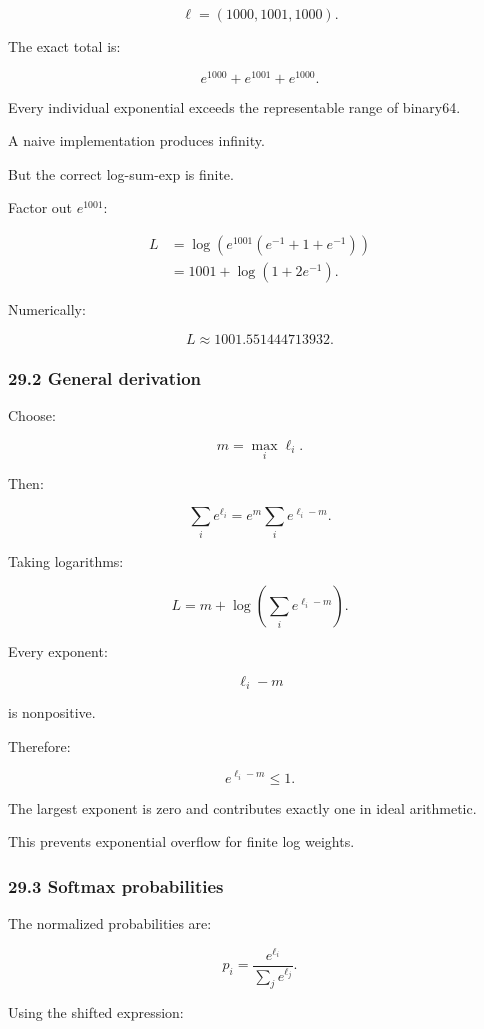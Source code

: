 \[ \ell=(1000,1001,1000). \]

The exact total is:

\[ e^{1000}+e^{1001}+e^{1000}. \]

Every individual exponential exceeds the representable range of binary64.

A naive implementation produces infinity.

But the correct log-sum-exp is finite.

Factor out \(e^{1001}\):

\[ \begin{aligned} L &= \log\left( e^{1001} (e^{-1}+1+e^{-1}) \right)\\ &= 1001+\log(1+2e^{-1}). \end{aligned} \]

Numerically:

\[ \boxed{ L\approx1001.551444713932 }. \]

\subsubsection{29.2 General derivation}\label{general-derivation}

Choose:

\[ m=\max_i\ell_i. \]

Then:

\[ \sum_ie^{\ell_i} = e^m\sum_ie^{\ell_i-m}. \]

Taking logarithms:

\[ \boxed{ L= m+\log\left( \sum_ie^{\ell_i-m} \right) }. \]

Every exponent:

\[ \ell_i-m \]

is nonpositive.

Therefore:

\[ e^{\ell_i-m}\le1. \]

The largest exponent is zero and contributes exactly one in ideal arithmetic.

This prevents exponential overflow for finite log weights.

\subsubsection{29.3 Softmax probabilities}\label{softmax-probabilities}

The normalized probabilities are:

\[ \boxed{ p_i= \frac{e^{\ell_i}} {\sum_je^{\ell_j}} }. \]

Using the shifted expression:

